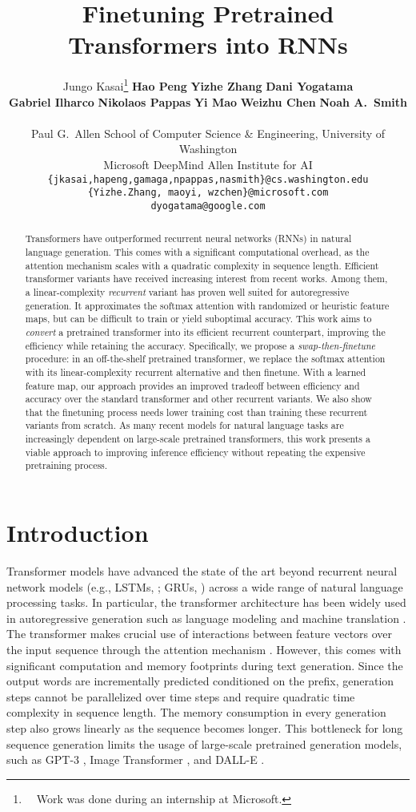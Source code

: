 \documentclass[11pt,a4paper]{article}
\title{Finetuning Pretrained Transformers into RNNs}
\author{
    Jungo Kasai\thanks{\ \ Work was done during an internship at Microsoft.}  
\quad
\quad 
\textbf{Hao Peng}
\quad 
\quad 
\textbf{Yizhe Zhang}
\quad 
\textbf{Dani Yogatama}\\
\textbf{Gabriel Ilharco} 
\quad
\textbf{Nikolaos Pappas} 
\quad 
\textbf{Yi Mao}
\quad 
\textbf{Weizhu Chen}
\quad
	\textbf{Noah A.\ Smith}\\
\\
    Paul G.\ Allen School of Computer Science \& Engineering, University of Washington
    \\
    Microsoft
\quad DeepMind
\quad Allen Institute for AI\\
    {\tt \{jkasai,hapeng,gamaga,npappas,nasmith\}@cs.washington.edu}\\
    {\tt \{Yizhe.Zhang, maoyi, wzchen\}@microsoft.com}\\
    {\tt dyogatama@google.com}
}
\date{}
\begin{document}
\maketitle
\begin{abstract}
Transformers have outperformed recurrent neural networks (RNNs) in natural language generation.
This comes with a significant computational overhead, as the attention mechanism scales with a quadratic complexity in sequence length.
Efficient transformer variants have received increasing interest from recent works. 
Among them, a linear-complexity \emph{recurrent} variant has proven well suited for autoregressive generation.
It approximates the softmax attention with randomized or heuristic feature maps,
but can be difficult to train or yield suboptimal accuracy.
This work aims to \emph{convert} a pretrained transformer into its efficient recurrent counterpart,
improving the efficiency while retaining the accuracy.
Specifically, we propose a \textit{swap-then-finetune} procedure:
in an off-the-shelf pretrained transformer, 
we replace the softmax attention with its linear-complexity recurrent alternative
and then finetune.
With a learned feature map, our approach 
provides an improved tradeoff between efficiency and accuracy over the standard transformer and other recurrent variants.
We also show that the finetuning process needs lower training cost than training these recurrent variants from scratch.
As many recent models for natural language tasks are increasingly dependent on large-scale pretrained transformers, this work presents a viable approach to improving inference efficiency without repeating the expensive pretraining process.







\end{abstract}

\section{Introduction}
Transformer models \cite{Vaswani2017AttentionIA} have advanced the state of the art beyond recurrent neural network models (e.g., LSTMs, \citealp{hochreiter1997long}; GRUs, \citealp{cho-etal-2014-properties}) across a wide range of natural language processing tasks.
In particular, the transformer architecture has been widely used in autoregressive generation such as language modeling \cite{Baevski2019AdaptiveIR} and machine translation \cite{Vaswani2017AttentionIA}.
The transformer makes crucial use of interactions between feature vectors over the input sequence through the attention mechanism \citep{Bahdanau2014NeuralMT}.
However, this comes with significant computation and memory footprints during text generation.
Since the output words are incrementally predicted 
conditioned on the prefix, generation steps cannot be parallelized over time steps
and require quadratic time complexity in sequence length.
The memory consumption in every generation step also grows linearly as the sequence becomes longer.
This bottleneck for long sequence generation limits the usage of large-scale pretrained generation models, such as GPT-3 \cite{gpt3}, Image Transformer \cite{imagetransformer}, and DALL-E \cite{DALLE}.
\end{document}
